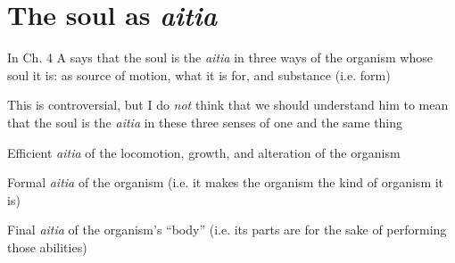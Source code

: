 \documentclass[11pt]{article}
\begin{document}
\section*{The soul as \emph{aitia}}

\noindent In Ch. 4 A says that the soul is the \emph{aitia} in three ways of the organism whose soul it is: as source of motion, what it is for, and substance (i.e. form)
\vspace*{2mm}

\noindent This is controversial, but I do \emph{not} think that we should understand him to mean that the soul is the \emph{aitia} in these three senses of one and the same thing
\vspace*{2mm}

Efficient \emph{aitia} of the locomotion, growth, and alteration of the organism
\vspace*{1mm}

Formal \emph{aitia} of the organism (i.e. it makes the organism the kind of organism it is)
\vspace*{1mm}

Final \emph{aitia} of the organism's ``body'' (i.e. its parts are for the sake of performing those abilities)
\end{document}
